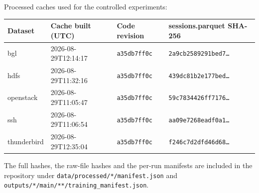 \documentclass[11pt,a4paper]{article}
\begin{document}
\noindent Processed caches used for the controlled experiments:

\begin{center}
\begin{tabular}{llll}
\toprule
Dataset & Cache built (UTC) & Code revision & sessions.parquet SHA-256 \\
\midrule
bgl & 2026-08-29T12:14:17 & \texttt{a35db7ff0c} & \texttt{2a9cb2589291bed7\ldots} \\
hdfs & 2026-08-29T11:32:16 & \texttt{a35db7ff0c} & \texttt{439dc81b2e177bed\ldots} \\
openstack & 2026-08-29T11:05:47 & \texttt{a35db7ff0c} & \texttt{59c7834426ff7176\ldots} \\
ssh & 2026-08-29T11:06:54 & \texttt{a35db7ff0c} & \texttt{aa09e7268eadf0a1\ldots} \\
thunderbird & 2026-08-29T12:35:04 & \texttt{a35db7ff0c} & \texttt{f246c7d2dfd46d68\ldots} \\
\bottomrule
\end{tabular}
\end{center}

\noindent The full hashes, the raw-file hashes and the per-run manifests are included
in the repository under \texttt{data/processed/*/manifest.json} and
\texttt{outputs/*/main/**/training\_manifest.json}.
\end{document}
